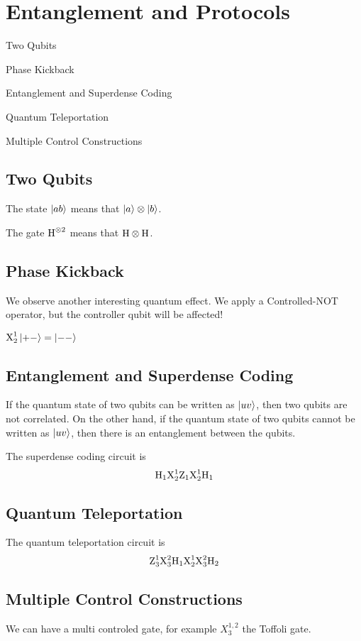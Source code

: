\section{Entanglement and Protocols}
\begin{introduction}
	\item Two Qubits
	\item Phase Kickback
	\item Entanglement and Superdense Coding
	\item Quantum Teleportation
	\item Multiple Control Constructions
\end{introduction}

\subsection{Two Qubits}
The state $\ket{ab}$ means that $\ket{a}\otimes\ket{b}$.

The gate $\text{H}^{\otimes 2}$ means that $\text{H}\otimes\text{H}$.

\subsection{Phase Kickback}
We observe another interesting quantum effect.
We apply a Controlled-NOT operator, but the controller qubit will be affected!

$\gate{X}^1_2\ket{+-}=\ket{--}$

\subsection{Entanglement and Superdense Coding}
If the quantum state of two qubits can be written as $\ket{uv}$, then two qubits are not correlated.
On the other hand, if the quantum state of two qubits cannot be written as $\ket{uv}$, then there is an entanglement between the qubits.

The superdense coding circuit is
\begin{equation*}
\text{H}_1 \text{X}^1_2 \text{Z}_{1}\text{X}^1_2\text{H}_1
\end{equation*}

\subsection{Quantum Teleportation}
The quantum teleportation circuit is
\begin{equation*}
	\text{Z}^1_3\text{X}^2_3\text{H}_1\text{X}^1_{2}\text{X}^2_3\text{H}_2
\end{equation*}

\subsection{Multiple Control Constructions}
We can have a multi controled gate, for example $X^{1,2}_3$ the Toffoli gate.